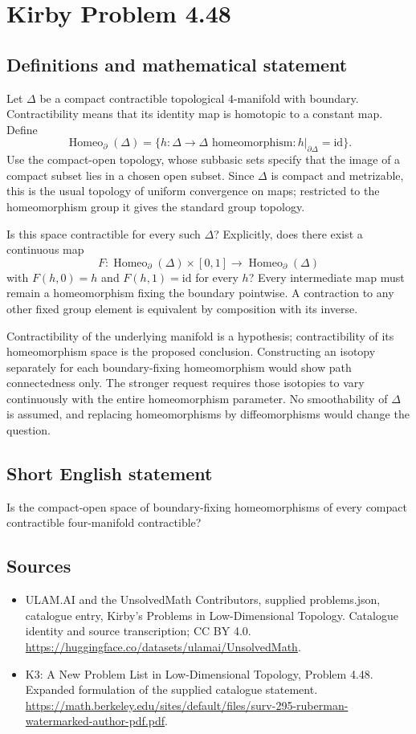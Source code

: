 \documentclass[11pt,a4paper]{article}
\begin{document}
\section*{Kirby Problem 4.48}\label{statement}

\subsection{Definitions and mathematical statement}
Let $\Delta$ be a compact contractible topological $4$-manifold with
boundary. Contractibility means that its identity map is homotopic
to a constant map. Define
\[
 \operatorname{Homeo}_{\partial}(\Delta)
 =\{h:\Delta\to\Delta\text{ homeomorphism}:h|_{\partial\Delta}=\mathrm{id}\}.
\]
Use the compact-open topology, whose subbasic sets specify that the
image of a compact subset lies in a chosen open subset. Since $\Delta$
is compact and metrizable, this is the usual topology of uniform
convergence on maps; restricted to the homeomorphism group it gives
the standard group topology.

Is this space contractible for every such $\Delta$? Explicitly, does
there exist a continuous map
\[
 F:\operatorname{Homeo}_{\partial}(\Delta)\times[0,1]
           \longrightarrow\operatorname{Homeo}_{\partial}(\Delta)
\]
with $F(h,0)=h$ and $F(h,1)=\mathrm{id}$ for every $h$?
Every intermediate map must remain a homeomorphism fixing the boundary
pointwise. A contraction to any other fixed group element is equivalent
by composition with its inverse.

Contractibility of the underlying manifold is a hypothesis; contractibility
of its homeomorphism space is the proposed conclusion. Constructing
an isotopy separately for each boundary-fixing homeomorphism would show
path connectedness only. The stronger request requires those isotopies
to vary continuously with the entire homeomorphism parameter.
No smoothability of $\Delta$ is assumed, and replacing homeomorphisms
by diffeomorphisms would change the question.
\subsection{Short English statement}
Is the compact-open space of boundary-fixing homeomorphisms of every compact contractible four-manifold contractible?
\subsection{Sources}
\begin{itemize}
\item[S1] ULAM.AI and the UnsolvedMath Contributors, supplied problems.json, catalogue entry, Kirby's Problems in Low-Dimensional Topology. Catalogue identity and source transcription; CC BY 4.0.
\url{https://huggingface.co/datasets/ulamai/UnsolvedMath}.
\item[S2] K3: A New Problem List in Low-Dimensional Topology, Problem 4.48. Expanded formulation of the supplied catalogue statement.
\url{https://math.berkeley.edu/sites/default/files/surv-295-ruberman-watermarked-author-pdf.pdf}.
\end{itemize}
\end{document}
